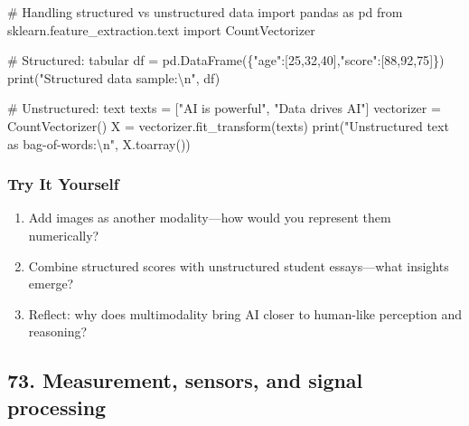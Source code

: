 \documentclass[
  letterpaper,
  DIV=11,
  numbers=noendperiod]{scrreprt}
\newenvironment{Shaded}{\begin{snugshade}}{\end{snugshade}}
\newcommand{\BuiltInTok}[1]{\textcolor[rgb]{0.00,0.23,0.31}{#1}}
\newcommand{\CharTok}[1]{\textcolor[rgb]{0.13,0.47,0.30}{#1}}
\newcommand{\CommentTok}[1]{\textcolor[rgb]{0.37,0.37,0.37}{#1}}
\newcommand{\DecValTok}[1]{\textcolor[rgb]{0.68,0.00,0.00}{#1}}
\newcommand{\ImportTok}[1]{\textcolor[rgb]{0.00,0.46,0.62}{#1}}
\newcommand{\NormalTok}[1]{\textcolor[rgb]{0.00,0.23,0.31}{#1}}
\newcommand{\OperatorTok}[1]{\textcolor[rgb]{0.37,0.37,0.37}{#1}}
\newcommand{\StringTok}[1]{\textcolor[rgb]{0.13,0.47,0.30}{#1}}
\providecommand{\tightlist}{%
  \setlength{\itemsep}{0pt}\setlength{\parskip}{0pt}}
\begin{document}
\begin{Shaded}
\begin{Highlighting}[]
\CommentTok{\# Handling structured vs unstructured data}
\ImportTok{import}\NormalTok{ pandas }\ImportTok{as}\NormalTok{ pd}
\ImportTok{from}\NormalTok{ sklearn.feature\_extraction.text }\ImportTok{import}\NormalTok{ CountVectorizer}

\CommentTok{\# Structured: tabular}
\NormalTok{df }\OperatorTok{=}\NormalTok{ pd.DataFrame(\{}\StringTok{"age"}\NormalTok{:[}\DecValTok{25}\NormalTok{,}\DecValTok{32}\NormalTok{,}\DecValTok{40}\NormalTok{],}\StringTok{"score"}\NormalTok{:[}\DecValTok{88}\NormalTok{,}\DecValTok{92}\NormalTok{,}\DecValTok{75}\NormalTok{]\})}
\BuiltInTok{print}\NormalTok{(}\StringTok{"Structured data sample:}\CharTok{\textbackslash{}n}\StringTok{"}\NormalTok{, df)}

\CommentTok{\# Unstructured: text}
\NormalTok{texts }\OperatorTok{=}\NormalTok{ [}\StringTok{"AI is powerful"}\NormalTok{, }\StringTok{"Data drives AI"}\NormalTok{]}
\NormalTok{vectorizer }\OperatorTok{=}\NormalTok{ CountVectorizer()}
\NormalTok{X }\OperatorTok{=}\NormalTok{ vectorizer.fit\_transform(texts)}
\BuiltInTok{print}\NormalTok{(}\StringTok{"Unstructured text as bag{-}of{-}words:}\CharTok{\textbackslash{}n}\StringTok{"}\NormalTok{, X.toarray())}
\end{Highlighting}
\end{Shaded}

\subsubsection{Try It Yourself}\label{try-it-yourself-71}

\begin{enumerate}
\def\labelenumi{\arabic{enumi}.}
\tightlist
\item
  Add images as another modality---how would you represent them
  numerically?
\item
  Combine structured scores with unstructured student essays---what
  insights emerge?
\item
  Reflect: why does multimodality bring AI closer to human-like
  perception and reasoning?
\end{enumerate}

\subsection{73. Measurement, sensors, and signal
processing}\label{measurement-sensors-and-signal-processing}
\end{document}
